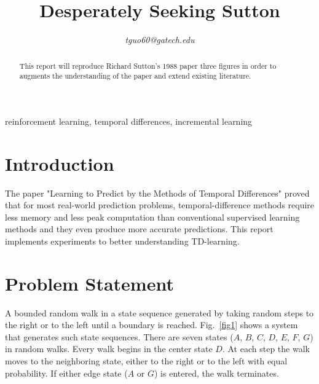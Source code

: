 \documentclass[conference]{IEEEtran}
\begin{document}


\title{Desperately Seeking Sutton\\
}

\author{
\textit{tguo60@gatech.edu}
}

\maketitle

\begin{abstract}
This report will reproduce Richard Sutton's 1988 paper\cite{b1} three figures in order to augments the understanding of the paper and extend existing literature.
\end{abstract}

\begin{IEEEkeywords}
reinforcement learning, temporal differences, incremental learning
\end{IEEEkeywords}

\section{Introduction}
The paper "Learning to Predict by the Methods of Temporal Differences" \cite{b1} proved that for most real-world prediction problems, temporal-difference methods require less memory and less peak computation than conventional supervised learning methods and they even produce more accurate predictions. This report implements \cite{b1} experiments to better understanding TD-learning.

\section{Problem Statement}
A bounded random walk in a state sequence generated by taking random steps to the right or to the left until a boundary is reached. Fig.~\ref{fig1} shows a system that generates such state sequences. There are seven states ($A$, $B$, $C$, $D$, $E$, $F$, $G$) in random walks. Every walk begins in the center state $D$. At each step the walk moves to the neighboring state, either to the right or to the left with equal probability. If either edge state ($A$ or $G$) is entered, the walk terminates. 
\end{document}
